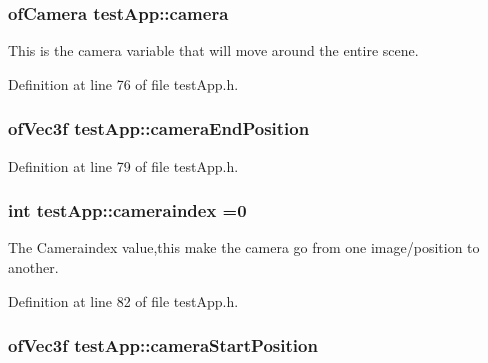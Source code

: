 \hypertarget{classtest_app_a0278ee237cbbd881252d6273b131bb55}{
\subsubsection[{camera}]{\setlength{\rightskip}{0pt plus 5cm}of\-Camera test\-App\-::camera}}\label{classtest_app_a0278ee237cbbd881252d6273b131bb55}


This is the camera variable that will move around the entire scene. 



Definition at line 76 of file test\-App.\-h.

\hypertarget{classtest_app_ad3319d9cd3cb00e898f4f602b879efad}{
\subsubsection[{camera\-End\-Position}]{\setlength{\rightskip}{0pt plus 5cm}of\-Vec3f test\-App\-::camera\-End\-Position}}\label{classtest_app_ad3319d9cd3cb00e898f4f602b879efad}


Definition at line 79 of file test\-App.\-h.

\hypertarget{classtest_app_a4ca3a51642dedbf37f2b9f6ef96510c7}{
\subsubsection[{cameraindex}]{\setlength{\rightskip}{0pt plus 5cm}int test\-App\-::cameraindex =0}}\label{classtest_app_a4ca3a51642dedbf37f2b9f6ef96510c7}


The Cameraindex value,this make the camera go from one image/position to another. 



Definition at line 82 of file test\-App.\-h.

\hypertarget{classtest_app_ac01013264b9988207e7fd9e0a486ff2f}{
\subsubsection[{camera\-Start\-Position}]{\setlength{\rightskip}{0pt plus 5cm}of\-Vec3f test\-App\-::camera\-Start\-Position}}\label{classtest_app_ac01013264b9988207e7fd9e0a486ff2f}


